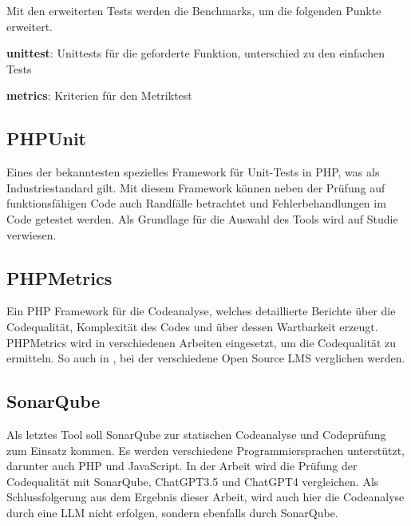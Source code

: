 Mit den erweiterten Tests werden die Benchmarks, um die folgenden Punkte erweitert.

\begin{myitemize}
	\item \textbf{unittest}: Unittests für die geforderte Funktion, unterschied zu den einfachen Tests
	\item \textbf{metrics}: Kriterien für den Metriktest
\end{myitemize}

\subsection{PHPUnit}
Eines der bekanntesten spezielles Framework für Unit-Tests in PHP, was als Industriestandard gilt. Mit diesem Framework können neben der Prüfung auf funktionsfähigen Code auch Randfälle betrachtet und Fehlerbehandlungen im Code getestet werden. Als Grundlage für die Auswahl des Tools wird auf Studie \cite{mohamad-2016} verwiesen.

\subsection{PHPMetrics}
Ein PHP Framework für die Codeanalyse, welches detaillierte Berichte über die Codequalität, Komplexität des Codes und über dessen Wartbarkeit erzeugt. PHPMetrics wird in verschiedenen Arbeiten eingesetzt, um die Codequalität zu ermitteln. So auch in \cite{anggrain-2016}, bei der verschiedene Open Source LMS verglichen werden.

\subsection{SonarQube}
Als letztes Tool soll SonarQube zur statischen Codeanalyse und Codeprüfung zum Einsatz kommen. Es werden verschiedene Programmiersprachen unterstützt, darunter auch PHP und JavaScript. In der Arbeit \cite{da-silva-simoes-2024} wird die Prüfung der Codequalität mit SonarQube, ChatGPT3.5 und ChatGPT4 vergleichen. Als Schlussfolgerung aus dem Ergebnis dieser Arbeit, wird auch hier die Codeanalyse durch eine LLM nicht erfolgen, sondern ebenfalls durch SonarQube.

